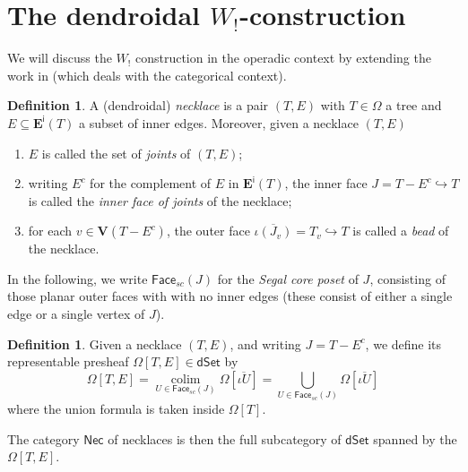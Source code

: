 \documentclass[a4paper,10pt
,draft
]{article}%
\numberwithin{equation}{section}
\numberwithin{figure}{section}
\theoremstyle{definition} %
\newtheorem{definition}[equation]{Definition}%
\DeclareMathOperator{\colim}{colim}%
\newcommand{\1}{\ensuremath{\mathbbm 1}}%
\begin{document}
\newpage
\appendix



\section{The dendroidal $W_!$-construction}


We will discuss the $W_!$
construction in the operadic context by extending the 
work in \cite{DS11}
(which deals with the categorical context).


\begin{definition}
A (dendroidal) \emph{necklace} is a pair $(T,E)$
with $T \in \Omega$
a tree and
$E \subseteq \boldsymbol{E}^{\mathsf{i}}(T)$
a subset of inner edges.
%
Moreover, given a necklace $(T,E)$
\begin{enumerate}[label = (\roman*)]
\item $E$ is called the set of \emph{joints} of $(T,E)$;
\item writing $E^c$ for the complement of $E$ in 
$\boldsymbol{E}^{\mathsf{i}}(T)$,
the inner face $J=T-E^c \hookrightarrow T$
is called the \emph{inner face of joints} of the necklace;
\item for each $v \in \boldsymbol{V}(T-E^c)$,
the outer face
$\overline{\iota(J_v)} = T_v \hookrightarrow T$
is called a \emph{bead} of the necklace.
\end{enumerate}
\end{definition}

In the following, we write 
$\mathsf{Face}_{sc}(J)$ for the \emph{Segal core poset} of $J$,
consisting of those planar outer faces with with no inner edges
(these consist of either a single edge or a single vertex of $J$).

\begin{definition}
	Given a necklace 
	$(T,E)$, 
	and writing $J = T-E^c$,
	we define its representable presheaf
	$\Omega[T,E] \in \mathsf{dSet}$ by
\begin{equation}
	\Omega[T,E] 
= 
	\underset{U \in \mathsf{Face}_{sc}(J)}{\colim}
	\Omega[\overline{\iota U}]
=
	\bigcup_{U \in \mathsf{Face}_{sc}(J)} 
	\Omega[\overline{\iota U}]
\end{equation}
	where the union formula is taken inside $\Omega[T]$.
	
	The category $\mathsf{Nec}$ of necklaces is then the full subcategory of $\mathsf{dSet}$
	spanned by the $\Omega[T,E]$.
\end{definition}
\end{document}

